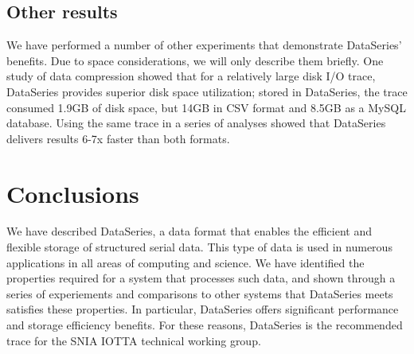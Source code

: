\documentclass{acm_proc_article-sp}
\begin{document}
\subsection{Other results}\label{sec:otherresults}

We have performed a number of other experiments that demonstrate
DataSeries' benefits. Due to space considerations, we will only
describe them briefly. One study of data compression showed that for a
relatively large disk I/O trace, DataSeries provides superior disk
space utilization; stored in DataSeries, the trace consumed 1.9GB of
disk space, but 14GB in CSV format and 8.5GB as a MySQL
database. Using the same trace in a series of analyses showed that
DataSeries delivers results 6-7x faster than both formats.

\section{Conclusions}\label{sec:conclusions}

We have described DataSeries, a data format that enables the efficient
and flexible storage of structured serial data. This type of data is
used in numerous applications in all areas of computing and
science. We have identified the properties required for a system that
processes such data, and shown through a series of experiements and
comparisons to other systems that DataSeries meets satisfies these
properties. In particular, DataSeries offers significant performance
and storage efficiency benefits.  For these reasons, DataSeries is the
recommended trace for the SNIA IOTTA technical working group.


{\small

}
%
%
\balancecolumns
\end{document}
